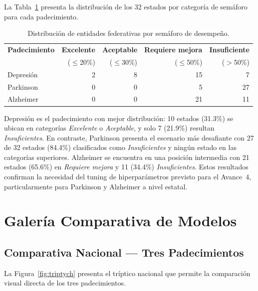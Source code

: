 \documentclass[11pt,a4paper]{article}
\begin{document}
La Tabla~\ref{tab:semaforo} presenta la distribución de los 32 estados por categoría de semáforo para cada padecimiento.

\begin{table}[H]
\centering
\caption{Distribución de entidades federativas por semáforo de desempeño.}
\label{tab:semaforo}
\begin{tabular}{@{}l r r r r@{}}
\toprule
\textbf{Padecimiento} & \textbf{Excelente} & \textbf{Aceptable} & \textbf{Requiere mejora} & \textbf{Insuficiente} \\
 & ($\leq$20\%) & ($\leq$30\%) & ($\leq$50\%) & ($>$50\%) \\
\midrule
Depresión & 2 & 8 & 15 & 7 \\
Parkinson & 0 & 0 & 5 & 27 \\
Alzheimer & 0 & 0 & 21 & 11 \\
\bottomrule
\end{tabular}
\end{table}

Depresión es el padecimiento con mejor distribución: 10 estados (31.3\%) se ubican en categorías \emph{Excelente} o \emph{Aceptable}, y solo 7 (21.9\%) resultan \emph{Insuficientes}. En contraste, Parkinson presenta el escenario más desafiante con 27 de 32 estados (84.4\%) clasificados como \emph{Insuficientes} y ningún estado en las categorías superiores. Alzheimer se encuentra en una posición intermedia con 21 estados (65.6\%) en \emph{Requiere mejora} y 11 (34.4\%) \emph{Insuficientes}. Estos resultados confirman la necesidad del tuning de hiperparámetros previsto para el Avance~4, particularmente para Parkinson y Alzheimer a nivel estatal.

\section{Galería Comparativa de Modelos}\label{sec:galeria}

\subsection{Comparativa Nacional — Tres Padecimientos}\label{sec:triptych}

La Figura~\ref{fig:triptych} presenta el tríptico nacional que permite la comparación visual directa de los tres padecimientos.
\end{document}
